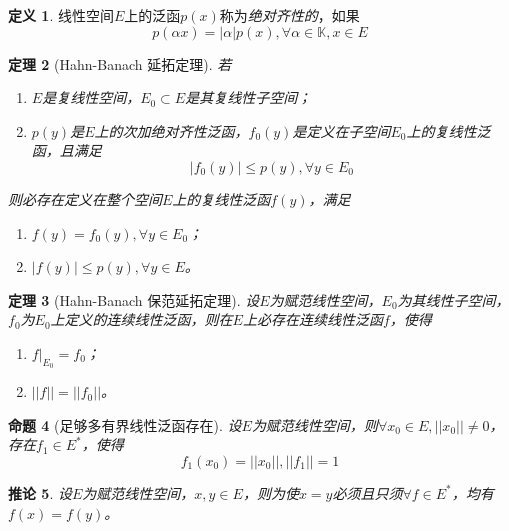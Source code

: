 \documentclass[winfonts,UTF8,c5size,a4paper,fancyhdr,hyperref,titlepage,nocap]{ctexart}
\theoremstyle{question}
\theoremstyle{theorem}
\newtheorem{thm}{定理}
\newtheorem{cor}[thm]{推论}
\newtheorem{prop}[thm]{命题}
\theoremstyle{definition}
\newtheorem{defn}[thm]{定义}
\theoremstyle{remark}
\numberwithin{equation}{subsection}
\newcommand{\K}{\mathbb{K}}
\newcommand{\red}{\color{red}}
\newcommand{\local}[2]{\left.{#1}\right|_{#2}}%
\begin{document}
\begin{defn}
线性空间$E$上的泛函$p(x)$称为\emph{\red 绝对齐性的}，如果
        \begin{equation*}
        p(\alpha x)=|\alpha|p(x), \forall\alpha\in\K,x\in E
        \end{equation*}
\end{defn}

\begin{thm}[Hahn-Banach 延拓定理]
若
\begin{enumerate}[1)]
    \setlength{\itemindent}{2ex}
    \item $E$是复线性空间，$E_0\subset E$是其复线性子空间；
    \item $p(y)$是$E$上的次加绝对齐性泛函，$f_0(y)$是定义在子空间$E_0$上的复线性泛函，且满足
      \begin{equation*}
        |f_0(y)|\leqslant p(y), \forall y\in E_0
      \end{equation*}
\end{enumerate}
则必存在定义在整个空间$E$上的复线性泛函$f(y)$，满足
\begin{enumerate}[1)]
    \setlength{\itemindent}{2ex}
    \item $f(y)=f_0(y), \forall y\in E_0$；
    \item $|f(y)|\leqslant p(y),\forall y\in E$。
\end{enumerate}
\end{thm}

\begin{thm}[Hahn-Banach 保范延拓定理]
设$E$为赋范线性空间，$E_0$为其线性子空间，$f_0$为$E_0$上定义的\emph{连续}线性泛函，则在$E$上必存在\emph{连续}线性泛函$f$，使得
\begin{enumerate}[1)]
    \setlength{\itemindent}{2ex}
    \item $\local{f}{E_0}=f_0$；
    \item $||f||=||f_0||$。
\end{enumerate}
\end{thm}

\begin{prop}[足够多有界线性泛函存在]
设$E$为赋范线性空间，则$\forall x_0\in E,||x_0||\neq0$，存在$f_1\in E^{\ast}$，使得
\begin{equation*}
f_1(x_0)=||x_0||, ||f_1||=1
\end{equation*}
\end{prop}
\begin{cor}
  设$E$为赋范线性空间，$x,y\in E$，则为使$x=y$必须且只须$\forall f\in E^{\ast}$，均有$f(x)=f(y)$。
\end{cor}
\end{document}
